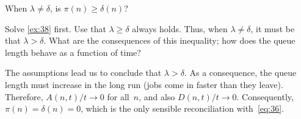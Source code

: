 \documentclass[stochastic-or.tex]{subfiles}
\begin{document}
\begin{exercise}\label{ex:26}
 When $\lambda\neq \delta$, is $\pi(n)\geq \delta(n)$?
\begin{hint}
Solve \cref{ex:38} first.
Use that $\lambda \geq \delta$ always holds.
Thus, when $\lambda \neq \delta$, it must be that $\lambda > \delta$.
What are the consequences of this inequality; how does the queue length behave as a function of time?
\end{hint}
\begin{solution}
 The assumptions lead us to conclude that $\lambda > \delta$. As a consequence, the queue length must increase in the long run (jobs come in faster than they leave). Therefore, $A(n,t)/t \to 0$ for all~$n$, and also $D(n,t)/t\to 0$. Consequently, $\pi(n) = \delta(n) = 0$, which is the only sensible reconciliation with~\cref{eq:36}.
\end{solution}
\end{exercise}






\end{document}
